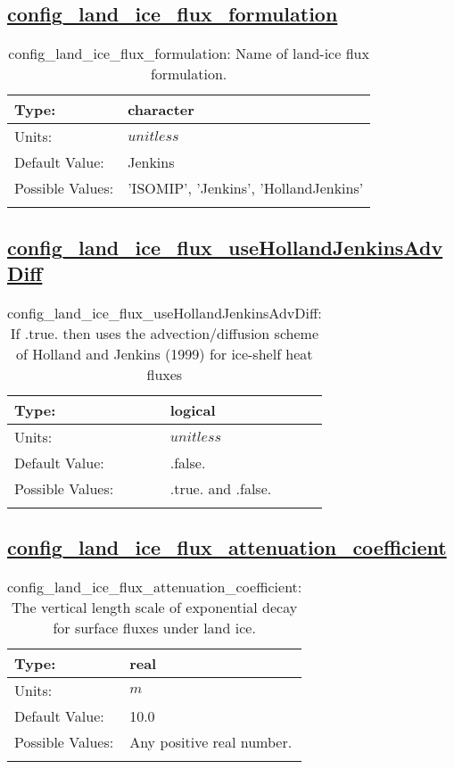 \subsection[config\_land\_ice\_flux\_formulation]{\hyperref[sec:nm_tab_land_ice_fluxes]{config\_land\_ice\_flux\_formulation}}
\label{subsec:nm_sec_config_land_ice_flux_formulation}
\begin{center}
\begin{longtable}{| p{2.0in} || p{4.0in} |}
    \hline
    Type: & character \\
    \hline
    Units: & $unitless$ \\
    \hline
    Default Value: & Jenkins \\
    \hline
    Possible Values: & 'ISOMIP', 'Jenkins', 'HollandJenkins' \\
    \hline
    \caption{config\_land\_ice\_flux\_formulation: Name of land-ice flux formulation.}
\end{longtable}
\end{center}
\subsection[config\_land\_ice\_flux\_useHollandJenkinsAdvDiff]{\hyperref[sec:nm_tab_land_ice_fluxes]{config\_land\_ice\_flux\_useHollandJenkinsAdvDiff}}
\label{subsec:nm_sec_config_land_ice_flux_useHollandJenkinsAdvDiff}
\begin{center}
\begin{longtable}{| p{2.0in} || p{4.0in} |}
    \hline
    Type: & logical \\
    \hline
    Units: & $unitless$ \\
    \hline
    Default Value: & .false. \\
    \hline
    Possible Values: & .true. and .false. \\
    \hline
    \caption{config\_land\_ice\_flux\_useHollandJenkinsAdvDiff: If .true. then uses the advection/diffusion scheme of Holland and Jenkins (1999) for ice-shelf heat fluxes}
\end{longtable}
\end{center}
\subsection[config\_land\_ice\_flux\_attenuation\_coefficient]{\hyperref[sec:nm_tab_land_ice_fluxes]{config\_land\_ice\_flux\_attenuation\_coefficient}}
\label{subsec:nm_sec_config_land_ice_flux_attenuation_coefficient}
\begin{center}
\begin{longtable}{| p{2.0in} || p{4.0in} |}
    \hline
    Type: & real \\
    \hline
    Units: & $m$ \\
    \hline
    Default Value: & 10.0 \\
    \hline
    Possible Values: & Any positive real number. \\
    \hline
    \caption{config\_land\_ice\_flux\_attenuation\_coefficient: The vertical length scale of exponential decay for surface fluxes under land ice.}
\end{longtable}
\end{center}
